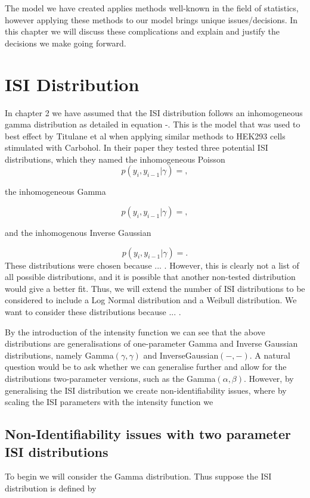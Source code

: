 \documentclass[../main.tex]{subfiles}
\begin{document}
The model we have created applies methods well-known in the field of statistics, however applying these methods to our model brings unique issues/decisions. In this chapter we will discuss these complications and explain and justify the decisions we make going forward. 

\section{ISI Distribution}
In chapter 2 we have assumed that the ISI distribution follows an inhomogeneous gamma distribution as detailed in equation -. This is the model that was used to best effect by Titulane et al \cite{} when applying similar methods to HEK293 cells stimulated with Carbohol. In their paper they tested three potential ISI distributions, which they named the inhomogeneous Poisson 
$$
p(y_i,y_{i-1} | \gamma) = ,
$$

the inhomogeneous Gamma

$$
p(y_i,y_{i-1} | \gamma) = ,
$$

and the inhomogenous Inverse Gaussian

$$
p(y_i,y_{i-1} | \gamma) = .
$$
These distributions were chosen because ... . However, this is clearly not a list of all possible distributions, and it is possible that another non-tested distribution would give a better fit. Thus, we will extend the number of ISI distributions to be considered to include a Log Normal distribution and a Weibull distribution. We want to consider these distributions because ... . 

By the introduction of the intensity function we can see that the above distributions are generalisations of one-parameter Gamma and Inverse Gaussian distributions, namely Gamma$(\gamma, \gamma)$ and InverseGaussian$(-,-)$. A natural question would be to ask whether we can generalise further and allow for the distributions two-parameter versions, such as the Gamma$(\alpha, \beta)$. However, by generalising the ISI distribution we create non-identifiability issues, where by scaling the ISI parameters with the intensity function we 
 
\subsection{Non-Identifiability issues with two parameter ISI distributions} 
To begin we will consider the Gamma distribution. Thus suppose the ISI distribution is defined by
\end{document}
